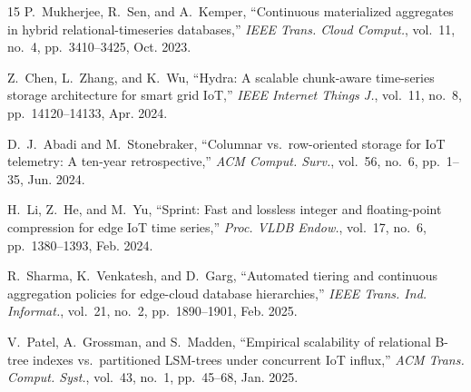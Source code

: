 \documentclass[conference,a4paper]{IEEEtran}
\begin{document}
\begin{thebibliography}{15}
P.~Mukherjee, R.~Sen, and A.~Kemper, ``Continuous materialized aggregates in hybrid relational-timeseries databases,'' \emph{IEEE Trans. Cloud Comput.}, vol.~11, no.~4, pp.~3410--3425, Oct. 2023.

Z.~Chen, L.~Zhang, and K.~Wu, ``Hydra: A scalable chunk-aware time-series storage architecture for smart grid IoT,'' \emph{IEEE Internet Things J.}, vol.~11, no.~8, pp.~14120--14133, Apr. 2024.

D.~J.~Abadi and M.~Stonebraker, ``Columnar vs.\ row-oriented storage for IoT telemetry: A ten-year retrospective,'' \emph{ACM Comput. Surv.}, vol.~56, no.~6, pp.~1--35, Jun. 2024.

H.~Li, Z.~He, and M.~Yu, ``Sprint: Fast and lossless integer and floating-point compression for edge IoT time series,'' \emph{Proc. VLDB Endow.}, vol.~17, no.~6, pp.~1380--1393, Feb. 2024.

R.~Sharma, K.~Venkatesh, and D.~Garg, ``Automated tiering and continuous aggregation policies for edge-cloud database hierarchies,'' \emph{IEEE Trans. Ind. Informat.}, vol.~21, no.~2, pp.~1890--1901, Feb. 2025.

V.~Patel, A.~Grossman, and S.~Madden, ``Empirical scalability of relational B-tree indexes vs.\ partitioned LSM-trees under concurrent IoT influx,'' \emph{ACM Trans. Comput. Syst.}, vol.~43, no.~1, pp.~45--68, Jan. 2025.

\end{thebibliography}
\end{document}
